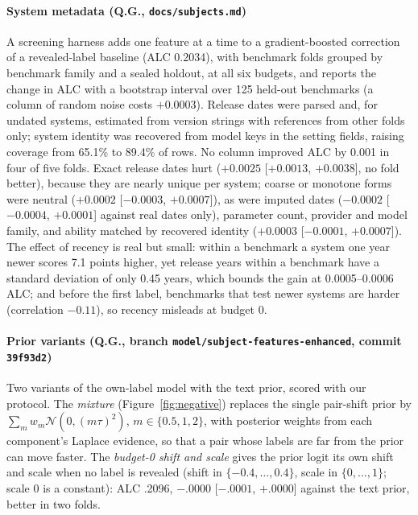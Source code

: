\documentclass{article}
\newcommand{\code}[1]{\texttt{#1}}
\newcommand{\N}{\mathcal{N}}
\begin{document}
\paragraph{System metadata (Q.G., \code{docs/subjects.md})} A screening harness adds one feature at a time to a gradient-boosted correction of a revealed-label baseline (ALC 0.2034), with benchmark folds grouped by benchmark family and a sealed holdout, at all six budgets, and reports the change in ALC with a bootstrap interval over 125 held-out benchmarks (a column of random noise costs $+0.0003$). Release dates were parsed and, for undated systems, estimated from version strings with references from other folds only; system identity was recovered from model keys in the setting fields, raising coverage from 65.1\% to 89.4\% of rows. No column improved ALC by 0.001 in four of five folds. Exact release dates hurt ($+0.0025$ [$+0.0013$, $+0.0038$], no fold better), because they are nearly unique per system; coarse or monotone forms were neutral ($+0.0002$ [$-0.0003$, $+0.0007$]), as were imputed dates ($-0.0002$ [$-0.0004$, $+0.0001$] against real dates only), parameter count, provider and model family, and ability matched by recovered identity ($+0.0003$ [$-0.0001$, $+0.0007$]). The effect of recency is real but small: within a benchmark a system one year newer scores 7.1 points higher, yet release years within a benchmark have a standard deviation of only 0.45 years, which bounds the gain at 0.0005--0.0006 ALC; and before the first label, benchmarks that test newer systems are harder (correlation $-0.11$), so recency misleads at budget 0.

\paragraph{Prior variants (Q.G., branch \code{model/subject-features-enhanced}, commit \code{39f93d2})} Two variants of the own-label model with the text prior, scored with our protocol. The \emph{mixture} (Figure~\ref{fig:negative}) replaces the single pair-shift prior by $\sum_m w_m \N(0, (m\tau)^2)$, $m \in \{0.5, 1, 2\}$, with posterior weights from each component's Laplace evidence, so that a pair whose labels are far from the prior can move faster. The \emph{budget-0 shift and scale} gives the prior logit its own shift and scale when no label is revealed (shift in $\{-0.4,\dots,0.4\}$, scale in $\{0,\dots,1\}$; scale 0 is a constant): ALC .2096, $-.0000$ [$-.0001$, $+.0000$] against the text prior, better in two folds.
\end{document}
